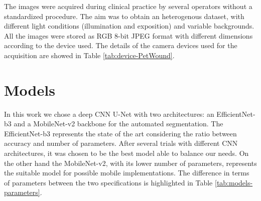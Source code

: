 \documentclass[../main.tex]{subfiles}
\begin{document}
The images were acquired during clinical practice by several operators without a standardized procedure. 
The aim was to obtain an heterogenous dataset, with different light conditions (illumination and exposition) and variable backgrounds.
All the images were stored as RGB 8-bit JPEG format with different dimensions according to the device used. The details of the camera devices used for the acquisition are showed in Table \ref{tab:device-PetWound}.

\begin{table}[!ht]
    \centering
    \caption{Main specifics of the camera devices used for the acquisition of the photos. The Petwound database is composed by images acquired with three different camera devices. In details, there are three different smartphone digital cameras and an Olympus digital camera.}
    \label{tab:device-PetWound}
\end{table}

\section{Models}

In this work we chose a deep CNN U-Net with two architectures: an EfficientNet-b3 \cite{tan2019efficientnet} and a MobileNet-v2 \cite{sandler2018mobilenetv2} backbone for the automated segmentation.
The EfficientNet-b3 represents the state of the art considering the ratio between accuracy and number of parameters. 
After several trials  with different CNN architectures, it was chosen to be the best model able to balance our needs.
On the other hand the MobileNet-v2, with its lower number of parameters, represents the suitable model for possible mobile implementations. 
The difference in terms of parameters between the two specifications is highlighted in Table \ref{tab:models-parameters}.
\end{document}
